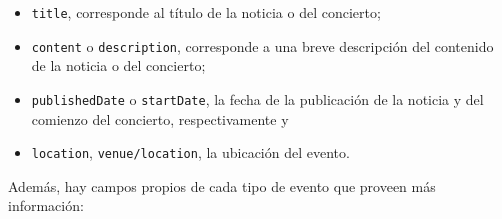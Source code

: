 \documentclass[11pt,letterpaper]{article}
\begin{document}
\begin{itemize}
\item \texttt{title}, corresponde al título de la noticia o del
      concierto;
\item \texttt{content} o \texttt{description}, corresponde a una breve descripción
      del contenido de la noticia o del concierto;
\item \texttt{publishedDate} o \texttt{startDate}, la fecha de la publicación de la
      noticia y del comienzo del concierto, respectivamente y
\item \texttt{location}, \texttt{venue/location}, la ubicación del evento.
\end{itemize}
    
    Además, hay campos propios de cada tipo de evento que proveen más
    información:
    
\end{document}
